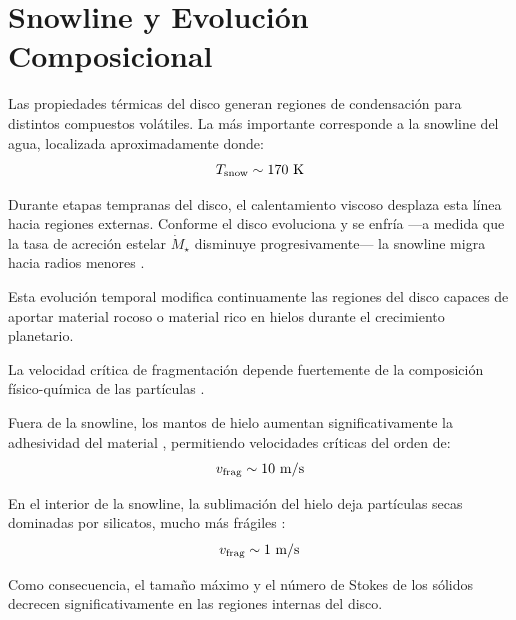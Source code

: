 
\section{Snowline y Evolución Composicional}


Las propiedades térmicas del disco generan regiones de condensación para distintos compuestos volátiles. La más importante corresponde a la snowline del agua, localizada aproximadamente donde:
\begin{equation}
T_{\rm snow} \sim 170 \ {\rm K}
\end{equation}

Durante etapas tempranas del disco, el calentamiento viscoso desplaza esta línea hacia regiones externas. Conforme el disco evoluciona y se enfría —a medida que la tasa de acreción estelar $\dot{M}_\star$ disminuye progresivamente— la snowline migra hacia radios menores \citep{Hartmann1998, Oka2011}.

Esta evolución temporal modifica continuamente las regiones del disco capaces de aportar material rocoso o material rico en hielos durante el crecimiento planetario.


La velocidad crítica de fragmentación depende fuertemente de la composición físico-química de las partículas \citep{Gundlach_2014, Blum2018, Musiolik_Grzegorz_Gerhard2019, Drazkowska2023}.

Fuera de la snowline, los mantos de hielo aumentan significativamente la adhesividad del material \citep{Gundlach_2014}, permitiendo velocidades críticas del orden de:
\begin{equation}
v_{\rm frag} \sim 10 \ {\rm m/s}
\end{equation}

En el interior de la snowline, la sublimación del hielo deja partículas secas dominadas por silicatos, mucho más frágiles \citep{Blum2018, Musiolik_Grzegorz_Gerhard2019}:
\begin{equation}
v_{\rm frag} \sim 1 \ {\rm m/s}
\end{equation}

Como consecuencia, el tamaño máximo y el número de Stokes de los sólidos decrecen significativamente en las regiones internas del disco.


